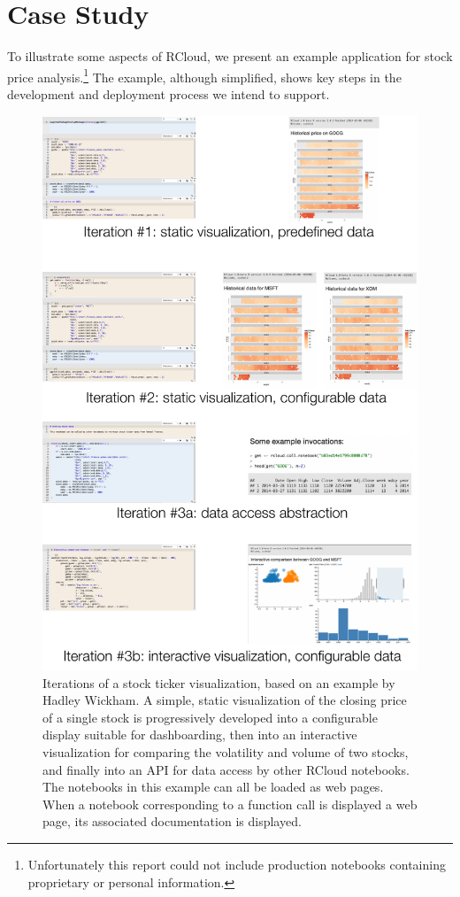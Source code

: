 \section{Case Study}

To illustrate some aspects of RCloud, we present an example application
for stock price analysis.\footnote{Unfortunately this report could not
include production notebooks containing proprietary or personal information.}
The example, although simplified, shows key steps in the development
and deployment process we intend to support.

\begin{figure}
\includegraphics[width=\linewidth]{fig/casestudy1/casestudy1.pdf}
\caption{\label{fig:stockvis}Iterations of a stock ticker
  visualization, based on an example by Hadley Wickham. A
  simple, static visualization of the closing price of a single stock
  is progressively developed into a configurable display suitable
  for dashboarding, then into an interactive visualization for 
  comparing the volatility and volume of two stocks, and finally
  into an API for data access by other RCloud notebooks. The notebooks
  in this example can all be loaded as web pages. When a notebook
  corresponding to a function call is displayed a web page,
  its associated documentation is displayed.}
\end{figure}

